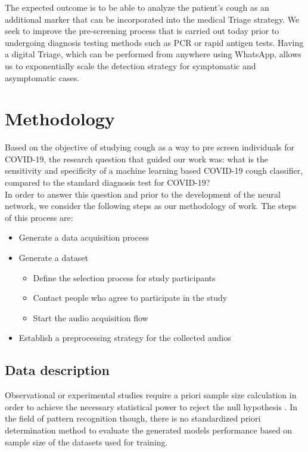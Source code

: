 \documentclass{nle}
\begin{document}
The expected outcome is to be able to analyze the patient’s cough as an additional marker that can be incorporated into the medical Triage strategy. We seek to improve the pre-screening process that is carried out today prior to undergoing diagnosis testing methods such as PCR or rapid antigen tests. Having a digital Triage, which can be performed from anywhere using WhatsApp, allows us to exponentially scale the detection strategy for symptomatic and asymptomatic cases.

\section{Methodology}

Based on the objective of studying cough as a way to pre screen individuals for COVID-19, the research question that guided our work was: what is the sensitivity and specificity of a machine learning based COVID-19 cough classifier, compared to the standard diagnosis test for COVID-19?\\

In order to answer this question and prior to the development of the neural network, we consider the following steps as our methodology of work. The steps of this process are:

\begin{itemize}
    \item Generate a data acquisition process
    \item Generate a dataset
    \begin{itemize}
        \item Define the selection process for study participants
        \item Contact people who agree to participate in the study
        \item Start the audio acquisition flow
\end{itemize}
    \item Establish a preprocessing strategy for the collected audios
\end{itemize}

\subsection{Data description}

Observational or experimental studies require a priori sample size calculation in order to achieve the necessary statistical power to reject the null hypothesis \cite{25}. In the field of pattern recognition though, there is no standardized priori determination method to evaluate the generated models performance based on sample size of the datasets used for training.\\
\end{document}
